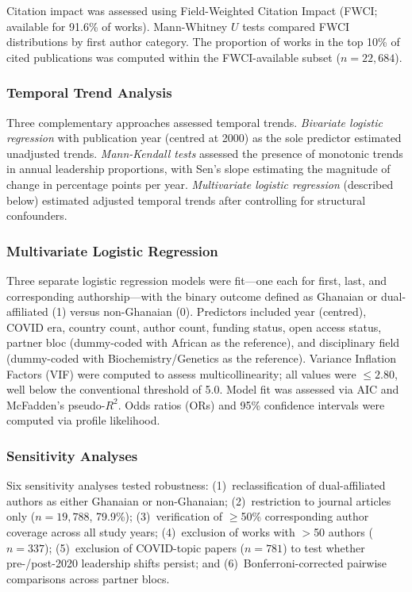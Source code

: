 \documentclass[12pt, a4paper]{article}
\begin{document}
Citation impact was assessed using Field-Weighted Citation Impact (FWCI; available for 91.6\% of works). Mann-Whitney $U$ tests compared FWCI distributions by first author category. The proportion of works in the top 10\% of cited publications was computed within the FWCI-available subset ($n = 22{,}684$).

\subsubsection{Temporal Trend Analysis}

Three complementary approaches assessed temporal trends. \emph{Bivariate logistic regression} with publication year (centred at 2000) as the sole predictor estimated unadjusted trends. \emph{Mann-Kendall tests} assessed the presence of monotonic trends in annual leadership proportions, with Sen's slope estimating the magnitude of change in percentage points per year. \emph{Multivariate logistic regression} (described below) estimated adjusted temporal trends after controlling for structural confounders.

\subsubsection{Multivariate Logistic Regression}

Three separate logistic regression models were fit---one each for first, last, and corresponding authorship---with the binary outcome defined as Ghanaian or dual-affiliated (1) versus non-Ghanaian (0). Predictors included year (centred), COVID era, country count, author count, funding status, open access status, partner bloc (dummy-coded with African as the reference), and disciplinary field (dummy-coded with Biochemistry/Genetics as the reference). Variance Inflation Factors (VIF) were computed to assess multicollinearity; all values were $\leq 2.80$, well below the conventional threshold of 5.0. Model fit was assessed via AIC and McFadden's pseudo-$R^2$. Odds ratios (ORs) and 95\% confidence intervals were computed via profile likelihood.

\subsubsection{Sensitivity Analyses}

Six sensitivity analyses tested robustness: (1)~reclassification of dual-affiliated authors as either Ghanaian or non-Ghanaian; (2)~restriction to journal articles only ($n = 19{,}788$, 79.9\%); (3)~verification of $\geq$50\% corresponding author coverage across all study years; (4)~exclusion of works with $>$50 authors ($n = 337$); (5)~exclusion of COVID-topic papers ($n = 781$) to test whether pre-/post-2020 leadership shifts persist; and (6)~Bonferroni-corrected pairwise comparisons across partner blocs.
\end{document}
